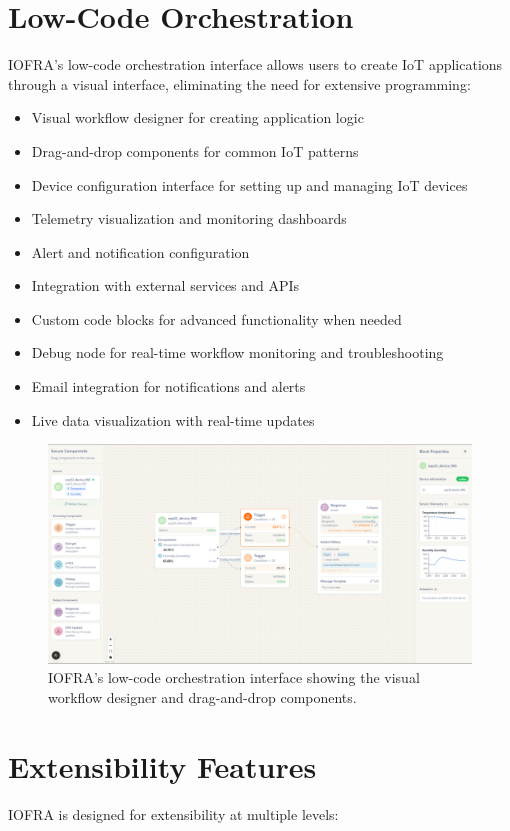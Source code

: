 \documentclass[conference]{IEEEtran}
\begin{document}
\section{Low-Code Orchestration}
IOFRA's low-code orchestration interface allows users to create IoT applications through a visual interface, eliminating the need for extensive programming:

\begin{itemize}
    \item Visual workflow designer for creating application logic
    \item Drag-and-drop components for common IoT patterns
    \item Device configuration interface for setting up and managing IoT devices
    \item Telemetry visualization and monitoring dashboards
    \item Alert and notification configuration
    \item Integration with external services and APIs
    \item Custom code blocks for advanced functionality when needed
    \item Debug node for real-time workflow monitoring and troubleshooting
    \item Email integration for notifications and alerts
    \item Live data visualization with real-time updates
\end{itemize}

\begin{figure}[!t]
\centering
\includegraphics[width=\linewidth]{canvas.png}
\caption{IOFRA's low-code orchestration interface showing the visual workflow designer and drag-and-drop components.}
\label{fig:canvas}
\end{figure}

\section{Extensibility Features}
IOFRA is designed for extensibility at multiple levels:
\end{document}

